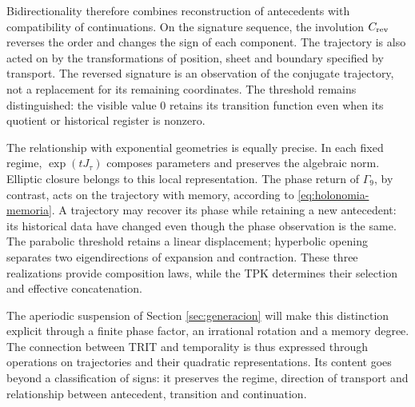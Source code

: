 Bidirectionality therefore combines reconstruction of antecedents
with compatibility of continuations. On the signature sequence, the
involution \(C_{\rm rev}\) reverses the order and changes the sign of each
component. The trajectory is also acted on by the transformations of
position, sheet and boundary specified by transport. The reversed
signature is an observation of the conjugate trajectory, not a replacement
for its remaining coordinates. The threshold remains distinguished: the
visible value \(0\) retains its transition function even when its quotient
or historical register is nonzero.

The relationship with exponential geometries is equally precise. In
each fixed regime, \(\exp(tJ_\tau)\) composes parameters and preserves the
algebraic norm. Elliptic closure belongs to this local representation.
The phase return of \(\Gamma_9\), by contrast, acts on the trajectory
with memory, according to \eqref{eq:holonomia-memoria}. A trajectory may
recover its phase while retaining a new antecedent: its historical data have
changed even though the phase observation is the same. The parabolic threshold
retains a linear displacement; hyperbolic opening separates two
eigendirections of expansion and contraction. These three realizations
provide composition laws, while the TPK determines their
selection and effective concatenation.

The aperiodic suspension of Section \ref{sec:generacion} will make
this distinction explicit through a finite phase factor, an irrational rotation
and a memory degree. The connection between TRIT and temporality is thus
expressed through operations on trajectories and their quadratic
representations. Its content goes beyond a classification of signs: it preserves the
regime, direction of transport and relationship between antecedent,
transition and continuation.
